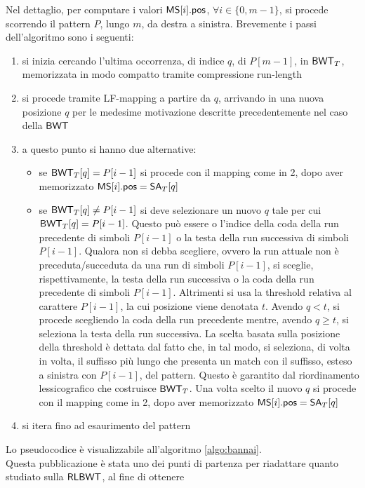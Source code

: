 Nel dettaglio, per computare i valori $\mbox{\rm {\sf MS}}[i].\mbox{\rm {\sf pos}}$, $\forall i\in\{0,m-1\}$,
 si procede scorrendo il
pattern $P$, lungo $m$, da destra a sinistra. Brevemente i passi dell'algoritmo
sono i seguenti: 
\begin{enumerate}
  \item si inizia cercando l'ultima occorrenza, di indice $q$, di $P[m-1]$,
  in $\mbox{\rm {\sf BWT}}_T$, memorizzata in modo
  compatto tramite compressione run-length
  \item si procede tramite LF-mapping a partire da $q$, arrivando in
  una nuova posizione $q$ per le medesime motivazione descritte precedentemente
  nel caso della $\mbox{\rm {\sf BWT}}$
  \item a questo punto si hanno due alternative:
  \begin{itemize}
    \item se $\mbox{\rm {\sf BWT}}_T[q]=P[i-1]$ si procede con il mapping come in 2, dopo aver
    memorizzato
    $\mbox{\rm {\sf MS}}[i].\mbox{\rm {\sf pos}} = \mbox{\rm {\sf SA}}_T[q]$
    \item se $\mbox{\rm {\sf BWT}}_T[q]\neq P[i-1]$ si deve selezionare un nuovo $q$ tale per cui
    $\mbox{\rm {\sf BWT}}_T[q]=P[i-1]$. Questo può essere o l'indice della coda della run
    precedente di simboli $P[i-1]$ o la testa della run successiva di simboli
    $P[i-1]$. Qualora non si debba scegliere, ovvero la run attuale non è
    preceduta/succeduta da una run di simboli $P[i-1]$, si sceglie,
    rispettivamente, la testa della run successiva o la coda della run
    precedente di simboli $P[i-1]$. Altrimenti si usa la threshold relativa al
    carattere $P[i-1]$, la cui posizione viene denotata $t$. Avendo
    $q<t$, si procede scegliendo la coda della run precedente mentre, avendo
    $q\geq t$, si seleziona la testa della run successiva. La scelta basata
    sulla posizione della threshold è dettata dal fatto che, in tal modo, si
    seleziona, di volta in volta, il suffisso più lungo che presenta un match
    con il suffisso, esteso a sinistra con $P[i-1]$, del pattern. Questo è
    garantito dal riordinamento lessicografico che costruisce $\mbox{\rm {\sf BWT}}_T$. 
    Una volta
    scelto il nuovo $q$ si procede con il mapping come in 2, dopo aver 
    memorizzato $\mbox{\rm {\sf MS}}[i].\mbox{\rm {\sf pos}} = \mbox{\rm {\sf SA}}_T[q]$
  \end{itemize}
  \item si itera fino ad esaurimento del pattern
\end{enumerate}
Lo pseudocodice è visualizzabile all'algoritmo \ref{algo:bannai}.\\
Questa pubblicazione è stata uno dei punti di partenza per
riadattare quanto studiato sulla $\mbox{\rm {\sf RLBWT}}$, al fine di ottenere

